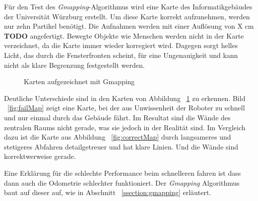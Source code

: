 \documentclass[11pt,a4paper]{article}
\begin{document}
{{
	Für den Test des \textit{Gmapping}-Algorithmus wird eine Karte des Informatikgebäudes der Universität Würzburg erstellt. Um diese Karte korrekt aufzunehmen, werden nur zehn Partikel ben\"otigt. Die Aufnahmen werden mit einer Auflösung von X cm \textbf{TODO} angefertigt. Bewegte Objekte wie Menschen werden nicht in der Karte verzeichnet, da die Karte immer wieder korregiert wird. Dagegen sorgt helles Licht, das durch die Fensterfronten scheint, f\"ur eine Ungenauigkeit und kann nicht als klare Begrenzung festgestellt werden.
	
	\begin{figure}[h]
		\centering
		\caption{Karten aufgezeichnet mit Gmapping \label{fig:maps}}
	\end{figure}
	
	
	Deutliche Unterschiede sind in den Karten von Abbildung ~\ref{fig:maps} zu erkennen. Bild ~\ref{fig:failMap} zeigt eine Karte, bei der aus Unwissenheit der Roboter zu schnell und nur einmal durch das Gebäude fährt. Im Resultat sind die Wände des zentralen Raums nicht gerade, was sie jedoch in der Realität sind. Im Vergleich dazu ist die Karte aus Abbildung ~\ref{fig:correctMap} durch langsameres und stetigeres Abfahren detailgetreuer und hat klare Linien. Und die Wände sind korrektwerweise gerade.
	
	
	Eine Erklärung f\"ur die schlechte Performance beim schnelleren fahren ist dass dann auch die Odometrie schlechter funktioniert. Der \textit{Gmapping} Algorithmus baut auf dieser auf, wie in Abschnitt ~\ref{ssection:gmapping} erl\"autert.
}




}
\end{document}
